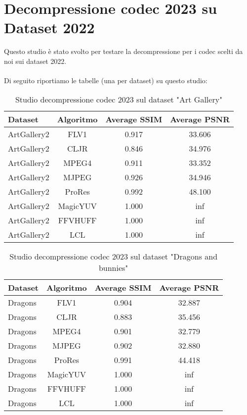 \clearpage
\section{Decompressione codec 2023 su Dataset 2022}
Questo studio è stato svolto per testare la decompressione per i codec scelti da noi sui dataset 2022.
\\
\\
Di seguito riportiamo le tabelle (una per dataset) su questo studio:

\begin{table}[ht]
\centering
\begin{tabular}{|l|c|c|c|}
\hline
Dataset               & Algoritmo & Average SSIM & Average PSNR \\ \hline
ArtGallery2           & FLV1      & 0.917        & 33.606       \\ \hline
ArtGallery2           & CLJR      & 0.846        & 34.976       \\ \hline
ArtGallery2           & MPEG4     & 0.911        & 33.352       \\ \hline
ArtGallery2           & MJPEG     & 0.926        & 34.946       \\ \hline
ArtGallery2           & ProRes    & 0.992        & 48.100       \\ \hline
ArtGallery2           & MagicYUV  & 1.000        & inf          \\ \hline
ArtGallery2           & FFVHUFF   & 1.000        & inf          \\ \hline
ArtGallery2           & LCL       & 1.000        & inf          \\ \hline
\end{tabular}
\caption{Studio decompressione codec 2023 sul dataset "Art Gallery"}
\end{table}

\begin{table}[ht]
\centering
\begin{tabular}{|l|c|c|c|}
\hline
Dataset               & Algoritmo & Average SSIM & Average PSNR
\\ \hline
Dragons               & FLV1      & 0.904        & 32.887       \\ \hline
Dragons               & CLJR      & 0.883        & 35.456       \\ \hline
Dragons               & MPEG4     & 0.901        & 32.779       \\ \hline
Dragons               & MJPEG     & 0.902        & 32.880       \\ \hline
Dragons               & ProRes    & 0.991        & 44.418       \\ \hline
Dragons               & MagicYUV  & 1.000        & inf          \\ \hline
Dragons               & FFVHUFF   & 1.000        & inf          \\ \hline
Dragons               & LCL       & 1.000        & inf          \\ \hline
\end{tabular}
\caption{Studio decompressione codec 2023 sul dataset "Dragons and bunnies"}
\end{table}

